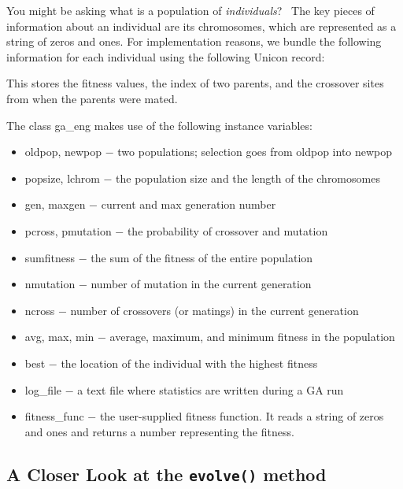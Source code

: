 You might be asking what is a population of \textit{individuals}? \ The
key pieces of information about an individual are its chromosomes,
which are represented as a string of zeros and ones. For implementation
reasons, we bundle the following information for each individual using
the following Unicon record: 


This stores the fitness values, the index of two parents, and the
crossover sites from when the parents were mated.

The class \textsf{ga\_eng} makes use of the following
instance variables: 

\begin{itemize}
\item \textsf{oldpop}, \textsf{newpop} $-$ two populations; selection
goes from \textsf{oldpop} into \textsf{newpop}
\item \textsf{popsize}, \textsf{lchrom} $-$ the population size and the
length of the chromosomes
\item \textsf{gen}, \textsf{maxgen} $-$ current and max generation
number
\item \textsf{pcross}, \textsf{pmutation} $-$ the probability of
crossover and mutation
\item \textsf{sumfitness} $-$ the sum of the fitness of the entire
population
\item \textsf{nmutation} $-$ number of mutation in the current
generation
\item \textsf{ncross} $-$ number of crossovers (or matings) in the
current generation
\item \textsf{avg}, \textsf{max}, \textsf{min} $-$ average, maximum, and
minimum fitness in the population
\item \textsf{best} $-$ the location of the individual with the highest
fitness
\item \textsf{log\_file} $-$ a text file where statistics are written
during a GA run
\item \textsf{fitness\_func} $-$ the user-supplied fitness function. It
reads a string of zeros and ones and returns a number representing the
fitness.
\end{itemize}


\subsection{A Closer Look at the \texttt{evolve()} method}

